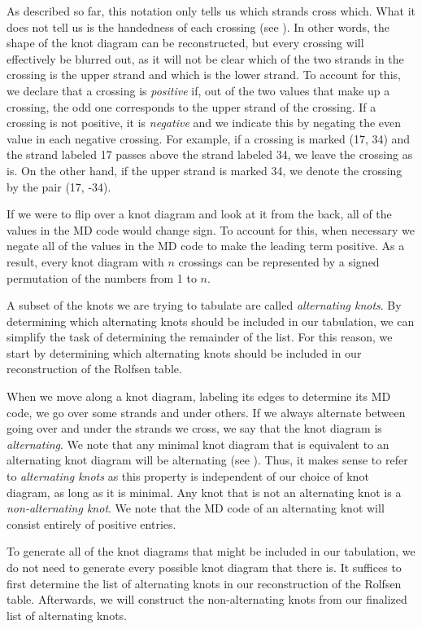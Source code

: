 \begin{paper}
As described so far, this notation only tells us which strands cross which.
What it does not tell us is the handedness of each crossing (see \figCrossings).
In other words, the shape of the knot diagram can be reconstructed, but every
crossing will effectively be blurred out, as it will not be clear which of the
two strands in the crossing is the upper strand and which is the lower strand.
To account for this, we declare that a crossing is \textit{positive} if, out of
the two values that make up a crossing, the odd one corresponds to the upper
strand of the crossing.
If a crossing is not positive, it is \textit{negative} and we indicate this by
negating the even value in each negative crossing.
For example, if a crossing is marked (17, 34) and the strand labeled 17 passes
above the strand labeled 34, we leave the crossing as is.
On the other hand, if the upper strand is marked 34, we denote the crossing by
the pair (17, -34).

If we were to flip over a knot diagram and look at it from the back, all of the
values in the MD code would change sign.
To account for this, when necessary we negate all of the values in the MD code
to make the leading term positive.
As a result, every knot diagram with $n$ crossings can be represented by a
signed permutation of the numbers from 1 to $n$.


A subset of the knots we are trying to tabulate are called
\textit{alternating knots}.
By determining which alternating knots should be included in our tabulation, we
can simplify the task of determining the remainder of the list.
For this reason, we start by determining which alternating knots should be
included in our reconstruction of the Rolfsen table.

When we move along a knot diagram, labeling its edges to determine its MD code,
we go over some strands and under others.
If we always alternate between going over and under the strands we cross, we say
that the knot diagram is \textit{alternating}.
We note that any minimal knot diagram that is equivalent to an alternating knot
diagram will be alternating (see \cite{new}).
Thus, it makes sense to refer to \textit{alternating knots} as this property is
independent of our choice of knot diagram, as long as it is minimal.
Any knot that is not an alternating knot is a \textit{non-alternating knot}.
We note that the MD code of an alternating knot will consist entirely of
positive entries.

To generate all of the knot diagrams that might be included in our tabulation,
we do not need to generate every possible knot diagram that there is.
It suffices to first determine the list of alternating knots in our
reconstruction of the Rolfsen table.
Afterwards, we will construct the non-alternating knots from our finalized list
of alternating knots.


\end{paper}
